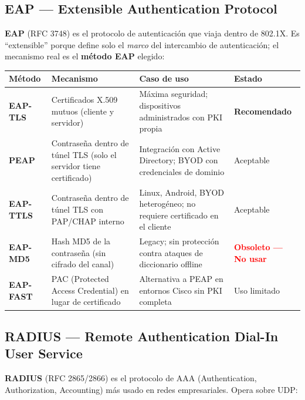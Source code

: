 \subsection{ EAP --- Extensible Authentication Protocol}

\textbf{EAP} (RFC 3748) es el protocolo de autenticación que viaja dentro de
802.1X. Es ``extensible'' porque define solo el \textit{marco} del intercambio
de autenticación; el mecanismo real es el \textbf{método EAP} elegido:

\begin{center}
\renewcommand{\arraystretch}{1.5}
\begin{tabular}{>{\bfseries}p{2.8cm} p{3.5cm} p{4.2cm} p{2.5cm}}
\toprule
\textbf{Método} & \textbf{Mecanismo} & \textbf{Caso de uso} & \textbf{Estado} \\
\midrule
EAP-TLS
    & Certificados X.509 mutuos (cliente y servidor)
    & Máxima seguridad; dispositivos administrados con PKI propia
    & \textcolor{green!60!black}{\textbf{Recomendado}} \\
PEAP
    & Contraseña dentro de túnel TLS (solo el servidor tiene certificado)
    & Integración con Active Directory; BYOD con credenciales de dominio
    & Aceptable \\
EAP-TTLS
    & Contraseña dentro de túnel TLS con PAP/CHAP interno
    & Linux, Android, BYOD heterogéneo; no requiere certificado en el cliente
    & Aceptable \\
EAP-MD5
    & Hash MD5 de la contraseña (sin cifrado del canal)
    & Legacy; sin protección contra ataques de diccionario offline
    & \textcolor{red}{\textbf{Obsoleto --- No usar}} \\
EAP-FAST
    & PAC (Protected Access Credential) en lugar de certificado
    & Alternativa a PEAP en entornos Cisco sin PKI completa
    & Uso limitado \\
\bottomrule
\end{tabular}
\end{center}

\subsection{ RADIUS --- Remote Authentication Dial-In User Service}

\textbf{RADIUS} (RFC 2865/2866) es el protocolo de AAA (Authentication,
Authorization, Accounting) más usado en redes empresariales. Opera sobre UDP:

